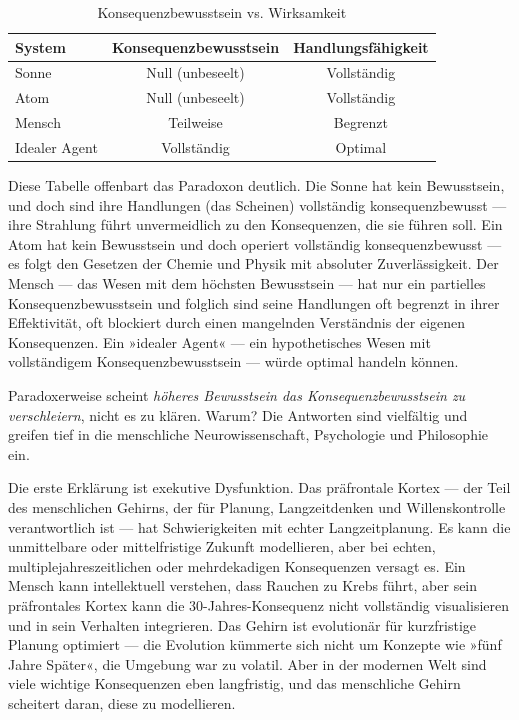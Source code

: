 \documentclass[12pt,a4paper]{article}
\begin{document}
\begin{table}[H]
\centering
\begin{tabular}{|l|c|c|}
\hline
\textbf{System} & \textbf{Konsequenzbewusstsein} & \textbf{Handlungsfähigkeit} \\
\hline
Sonne & Null (unbeseelt) & Vollständig \\
Atom & Null (unbeseelt) & Vollständig \\
Mensch & Teilweise & Begrenzt \\
Idealer Agent & Vollständig & Optimal \\
\hline
\end{tabular}
\caption{Konsequenzbewusstsein vs. Wirksamkeit}
\end{table}

Diese Tabelle offenbart das Paradoxon deutlich. Die Sonne hat kein Bewusstsein, und doch sind ihre Handlungen (das Scheinen) vollständig konsequenzbewusst — ihre Strahlung führt unvermeidlich zu den Konsequenzen, die sie führen soll. Ein Atom hat kein Bewusstsein und doch operiert vollständig konsequenzbewusst — es folgt den Gesetzen der Chemie und Physik mit absoluter Zuverlässigkeit. Der Mensch — das Wesen mit dem höchsten Bewusstsein — hat nur ein partielles Konsequenzbewusstsein und folglich sind seine Handlungen oft begrenzt in ihrer Effektivität, oft blockiert durch einen mangelnden Verständnis der eigenen Konsequenzen. Ein »idealer Agent« — ein hypothetisches Wesen mit vollständigem Konsequenzbewusstsein — würde optimal handeln können.

Paradoxerweise scheint \textit{höheres Bewusstsein das Konsequenzbewusstsein zu verschleiern}, nicht es zu klären. Warum? Die Antworten sind vielfältig und greifen tief in die menschliche Neurowissenschaft, Psychologie und Philosophie ein.

Die erste Erklärung ist exekutive Dysfunktion. Das präfrontale Kortex — der Teil des menschlichen Gehirns, der für Planung, Langzeitdenken und Willenskontrolle verantwortlich ist — hat Schwierigkeiten mit echter Langzeitplanung. Es kann die unmittelbare oder mittelfristige Zukunft modellieren, aber bei echten, multiplejahreszeitlichen oder mehrdekadigen Konsequenzen versagt es. Ein Mensch kann intellektuell verstehen, dass Rauchen zu Krebs führt, aber sein präfrontales Kortex kann die 30-Jahres-Konsequenz nicht vollständig visualisieren und in sein Verhalten integrieren. Das Gehirn ist evolutionär für kurzfristige Planung optimiert — die Evolution kümmerte sich nicht um Konzepte wie »fünf Jahre Später«, die Umgebung war zu volatil. Aber in der modernen Welt sind viele wichtige Konsequenzen eben langfristig, und das menschliche Gehirn scheitert daran, diese zu modellieren.
\end{document}
